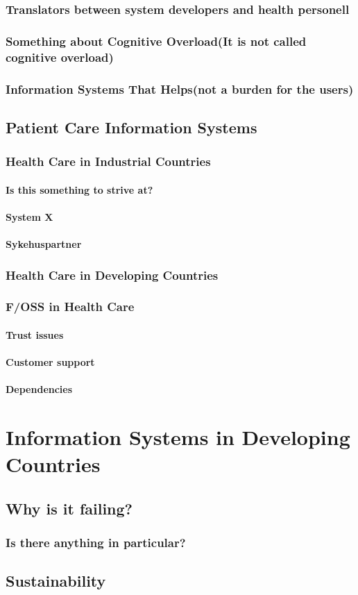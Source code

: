 \subsection{Translators between system developers and health personell \cite{9}}
\subsection{Something about Cognitive Overload(It is not called cognitive overload)}
\subsection{Information Systems That Helps(not a burden for the users)}
\section{Patient Care Information Systems}
\subsection{Health Care in Industrial Countries}
\subsubsection{Is this something to strive at?}
\subsubsection{System X}
\subsubsection{Sykehuspartner}
\subsection{Health Care in Developing Countries}
\subsection{F/OSS in Health Care}
\subsubsection{Trust issues}
\subsubsection{Customer support}
\subsubsection{Dependencies}
\chapter{Information Systems in Developing Countries \cite{7}}
\section{Why is it failing?}
\subsection{Is there anything in particular?}
\section{Sustainability}
